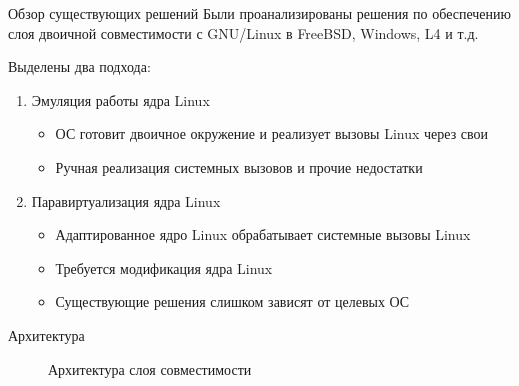 \documentclass[english,russian,aspectratio=169]{beamer}
\begin{document}
\begin{frame}[t]{Обзор существующих решений}
Были проанализированы решения по обеспечению слоя двоичной совместимости с GNU/Linux в FreeBSD, Windows, L4 и т.д.

\vspace{8pt}
Выделены два подхода:
\begin{enumerate}
    \item Эмуляция работы ядра Linux
    \begin{itemize}
        \item ОС готовит двоичное окружение и реализует вызовы Linux через свои
        \item Ручная реализация системных вызовов и прочие недостатки
    \end{itemize}
    \item Паравиртуализация ядра Linux
    \begin{itemize}
        \item Адаптированное ядро Linux обрабатывает системные вызовы Linux
        \item Требуется модификация ядра Linux
        \item Существующие решения слишком зависят от целевых ОС
    \end{itemize}
\end{enumerate}
\end{frame}

\begin{frame}[t]{Архитектура}
\begin{figure}[h]
\caption{Архитектура слоя совместимости}
\end{figure}
\end{frame}
\end{document}
